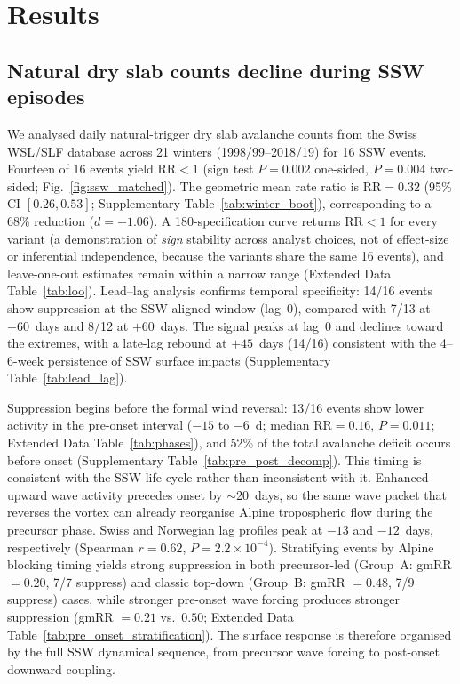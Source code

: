 \documentclass[11pt,letterpaper]{article}
\begin{document}
\section*{Results}

\subsection*{Natural dry slab counts decline during SSW episodes}

We analysed daily natural-trigger dry slab avalanche counts from the Swiss WSL/SLF database across 21 winters (1998/99--2018/19) for 16 SSW events\cite{Butler2015}. Fourteen of 16 events yield $\mathrm{RR} < 1$ (sign test $P = 0.002$ one-sided, $P = 0.004$ two-sided; Fig.~\ref{fig:ssw_matched}). The geometric mean rate ratio is $\mathrm{RR} = 0.32$ (95\% CI $[0.26, 0.53]$; Supplementary Table~\ref{tab:winter_boot}), corresponding to a 68\% reduction ($d = -1.06$). A 180-specification curve returns $\mathrm{RR} < 1$ for every variant (a demonstration of \emph{sign} stability across analyst choices, not of effect-size or inferential independence, because the variants share the same 16 events), and leave-one-out estimates remain within a narrow range (Extended Data Table~\ref{tab:loo}). Lead--lag analysis confirms temporal specificity: 14/16 events show suppression at the SSW-aligned window (lag~0), compared with 7/13 at $-60$~days and 8/12 at $+60$~days. The signal peaks at lag~0 and declines toward the extremes, with a late-lag rebound at $+45$~days (14/16) consistent with the 4--6-week persistence of SSW surface impacts\cite{Baldwin2001} (Supplementary Table~\ref{tab:lead_lag}).

Suppression begins before the formal wind reversal: 13/16 events show lower activity in the pre-onset interval ($-15$ to $-6$~d; median $\mathrm{RR} = 0.16$, $P = 0.011$; Extended Data Table~\ref{tab:phases}), and 52\% of the total avalanche deficit occurs before onset (Supplementary Table~\ref{tab:pre_post_decomp}). This timing is consistent with the SSW life cycle rather than inconsistent with it. Enhanced upward wave activity precedes onset by $\sim$20~days\cite{Polvani2004}, so the same wave packet that reverses the vortex can already reorganise Alpine tropospheric flow during the precursor phase. Swiss and Norwegian lag profiles peak at $-13$ and $-12$~days, respectively (Spearman $r = 0.62$, $P = 2.2 \times 10^{-4}$). Stratifying events by Alpine blocking timing yields strong suppression in both precursor-led (Group~A: gmRR $= 0.20$, 7/7 suppress) and classic top-down (Group~B: gmRR $= 0.48$, 7/9 suppress) cases, while stronger pre-onset wave forcing produces stronger suppression (gmRR $= 0.21$ vs.\ $0.50$; Extended Data Table~\ref{tab:pre_onset_stratification}). The surface response is therefore organised by the full SSW dynamical sequence, from precursor wave forcing to post-onset downward coupling.
\end{document}

